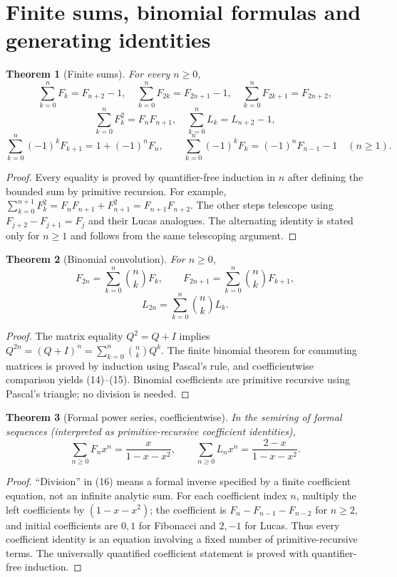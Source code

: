 \documentclass[11pt]{article}
\newtheorem{theorem}{Theorem}[section]
\begin{document}
\section{Finite sums, binomial formulas and generating identities}
\begin{theorem}[Finite sums]
For every $n\ge0$,
\[\sum_{k=0}^n F_k=F_{n+2}-1,\quad \sum_{k=0}^n F_{2k}=F_{2n+1}-1,\quad\sum_{k=0}^n F_{2k+1}=F_{2n+2},\tag{12}\]
\[\sum_{k=0}^n F_k^2=F_nF_{n+1},\quad \sum_{k=0}^n L_k=L_{n+2}-1,\tag{13}\]
\[\sum_{k=0}^n (-1)^k F_{k+1}=1+(-1)^n F_n,\qquad
\sum_{k=0}^n(-1)^kF_k=(-1)^nF_{n-1}-1\quad(n\ge1).\tag{14}\]
\end{theorem}
\begin{proof}
Every equality is proved by quantifier-free induction in $n$ after defining the bounded sum by primitive recursion. For example, $\sum_{k=0}^{n+1}F_k^2=F_nF_{n+1}+F_{n+1}^2=F_{n+1}F_{n+2}$. The other steps telescope using $F_{j+2}-F_{j+1}=F_j$ and their Lucas analogues. The alternating identity is stated only for $n\ge1$ and follows from the same telescoping argument.
\end{proof}

\begin{theorem}[Binomial convolution]
For $n\ge0$,
\[F_{2n}=\sum_{k=0}^n\binom nk F_k,\qquad F_{2n+1}=\sum_{k=0}^n\binom nk F_{k+1},\tag{14}\]
\[ L_{2n}=\sum_{k=0}^n\binom nk L_k.\tag{15}\]
\end{theorem}
\begin{proof}
The matrix equality $Q^2=Q+I$ implies $Q^{2n}=(Q+I)^n=\sum_{k=0}^n \binom nk Q^k$. The finite binomial theorem for commuting matrices is proved by induction using Pascal's rule, and coefficientwise comparison yields (14)--(15). Binomial coefficients are primitive recursive using Pascal's triangle; no division is needed.
\end{proof}
\begin{theorem}[Formal power series, coefficientwise]
In the semiring of formal sequences (interpreted as primitive-recursive coefficient identities),
\[\sum_{n\ge0}F_nx^n=\frac{x}{1-x-x^2},\qquad \sum_{n\ge0}L_nx^n=\frac{2-x}{1-x-x^2}.\tag{16}\]
\end{theorem}
\begin{proof}
``Division'' in (16) means a formal inverse specified by a finite coefficient equation, not an infinite analytic sum. For each coefficient index $n$, multiply the left coefficients by $(1-x-x^2)$; the coefficient is $F_n-F_{n-1}-F_{n-2}$ for $n\ge2$, and initial coefficients are $0,1$ for Fibonacci and $2,-1$ for Lucas. Thus every coefficient identity is an equation involving a fixed number of primitive-recursive terms. The universally quantified coefficient statement is proved with quantifier-free induction.
\end{proof}
\end{document}

